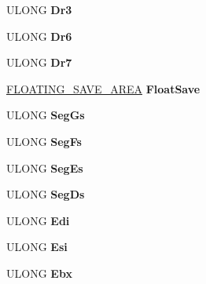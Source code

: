 \begin{DoxyCompactItemize}
\mbox{\label{struct___c_o_n_t_e_x_t_a1c4aaaec402b4438f124c0f9c9b08f39}} 
U\+L\+O\+NG {\bfseries Dr3}
\item 
\mbox{\label{struct___c_o_n_t_e_x_t_a7e112d6bbefc5fe4b4816ffd91966aef}} 
U\+L\+O\+NG {\bfseries Dr6}
\item 
\mbox{\label{struct___c_o_n_t_e_x_t_af7cbb0ec60a4676eb38b3200b0d8296b}} 
U\+L\+O\+NG {\bfseries Dr7}
\item 
\mbox{\label{struct___c_o_n_t_e_x_t_ae9344016f776a7a1e683b5732157e9e9}} 
\hyperlink{struct___f_l_o_a_t_i_n_g___s_a_v_e___a_r_e_a}{F\+L\+O\+A\+T\+I\+N\+G\+\_\+\+S\+A\+V\+E\+\_\+\+A\+R\+EA} {\bfseries Float\+Save}
\item 
\mbox{\label{struct___c_o_n_t_e_x_t_ac8097e292ac55b5a509f93efd2ea3b1b}} 
U\+L\+O\+NG {\bfseries Seg\+Gs}
\item 
\mbox{\label{struct___c_o_n_t_e_x_t_a12fde41792b1cf8beb340018c4f6e5c9}} 
U\+L\+O\+NG {\bfseries Seg\+Fs}
\item 
\mbox{\label{struct___c_o_n_t_e_x_t_aeddb104badfeae1a3f32a344468ed42d}} 
U\+L\+O\+NG {\bfseries Seg\+Es}
\item 
\mbox{\label{struct___c_o_n_t_e_x_t_abf75fd5ad0a1efe75b7de2b64a22d23c}} 
U\+L\+O\+NG {\bfseries Seg\+Ds}
\item 
\mbox{\label{struct___c_o_n_t_e_x_t_af6642a592c6f79b8c73901d4b9118c09}} 
U\+L\+O\+NG {\bfseries Edi}
\item 
\mbox{\label{struct___c_o_n_t_e_x_t_a25888dff2d68fa20cd501c7fc6ab788c}} 
U\+L\+O\+NG {\bfseries Esi}
\item 
\mbox{\label{struct___c_o_n_t_e_x_t_af2a56d519d215fcd1b5b6161542f0021}} 
U\+L\+O\+NG {\bfseries Ebx}
\item 
\mbox{\label{struct___c_o_n_t_e_x_t_a2440f973761651bcccd82d4d4f423c82}} 

\end{DoxyCompactItemize}
